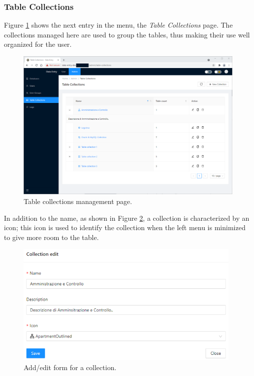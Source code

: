 \subsubsection{Table Collections}
Figure \ref{fig:collect} shows the next entry in the menu, the \emph{Table Collections} page. The collections managed here are used to group the tables, thus making their use well organized for the user.
\begin{figure}[!htb]
    \centering
    \includegraphics[width=15.8cm]{chapters/images/ch_3/FE/Admin/table_collections.png}
    \caption{Table collections management page.}
    \label{fig:collect}
\end{figure}

In addition to the name, as shown in Figure \ref{fig:editCollect}, a collection is characterized by an icon; this icon is used to identify the collection when the left menu is minimized to give more room to the table.

\begin{figure}[!htb]
    \centering
    \includegraphics[width=11cm]{chapters/images/ch_3/FE/Admin/editCollect.png}
    \caption{Add/edit form for a collection.}
    \label{fig:editCollect}
\end{figure}

